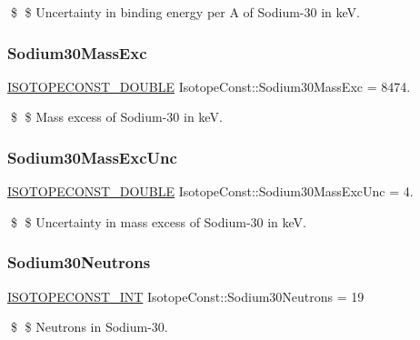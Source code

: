 \$ \$ Uncertainty in binding energy per A of Sodium-\/30 in keV. \mbox{\label{group___isotope_const-_sodium-_na30_ga371a56634549d45707e2012e98c8d7b4}} 
\subsubsection{\texorpdfstring{Sodium30\+Mass\+Exc}{Sodium30MassExc}}
{\footnotesize\ttfamily \mbox{\hyperlink{group___isotope_const-_macros_ga8f45a7272ce02c0b4c65c44636ed719a}{I\+S\+O\+T\+O\+P\+E\+C\+O\+N\+S\+T\+\_\+\+D\+O\+U\+B\+LE}} Isotope\+Const\+::\+Sodium30\+Mass\+Exc = 8474.}

\$ \$ Mass excess of Sodium-\/30 in keV. \mbox{\label{group___isotope_const-_sodium-_na30_ga6bcfaa9f4e5e1b5a3dd4bc30e3897590}} 
\subsubsection{\texorpdfstring{Sodium30\+Mass\+Exc\+Unc}{Sodium30MassExcUnc}}
{\footnotesize\ttfamily \mbox{\hyperlink{group___isotope_const-_macros_ga8f45a7272ce02c0b4c65c44636ed719a}{I\+S\+O\+T\+O\+P\+E\+C\+O\+N\+S\+T\+\_\+\+D\+O\+U\+B\+LE}} Isotope\+Const\+::\+Sodium30\+Mass\+Exc\+Unc = 4.}

\$ \$ Uncertainty in mass excess of Sodium-\/30 in keV. \mbox{\label{group___isotope_const-_sodium-_na30_ga105f81c19b64badfdec0b9cb6b7b830a}} 
\subsubsection{\texorpdfstring{Sodium30\+Neutrons}{Sodium30Neutrons}}
{\footnotesize\ttfamily \mbox{\hyperlink{group___isotope_const-_macros_ga5f18360b3e99483a35c32d789e62621c}{I\+S\+O\+T\+O\+P\+E\+C\+O\+N\+S\+T\+\_\+\+I\+NT}} Isotope\+Const\+::\+Sodium30\+Neutrons = 19}

\$ \$ Neutrons in Sodium-\/30. \mbox{\label{group___isotope_const-_sodium-_na30_ga626f84fc08b3429bf6dcc4e6fa73ea1f}} 
